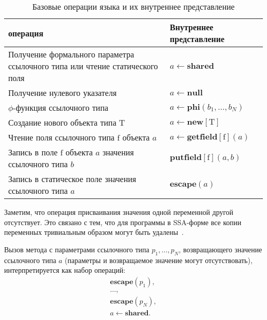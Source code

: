 \documentclass[14pt,titlepage,draft]{extarticle}
\newcommand{\java}{\eng{Java}\xspace}
\let\mathphi\phi
\renewcommand{\phi}{\ensuremath{\mathphi}}
\newcommand{\type}[1]{\mathrm{#1}}
\newcommand{\field}[1]{\mathrm{#1}}
\newcommand{\op}[1]{\mathbf{#1}}
\begin{document}
    \begin{table}[htb]
      \centering

      \begin{tabular}{|p{}|p{}|}\hline
        \textbf{\java операция} &
          \textbf{Внутреннее представление}\\ \hline

        Получение формального параметра ссылочного типа или
        чтение статического поля
        & $a \gets \op{shared}$
        \\ \hline

        Получение нулевого указателя
        & $a \gets \op{null}$
        \\ \hline

        \phi-функция ссылочного типа
        & $a \gets \op{phi}(b_1, \ldots, b_N)$
        \\ \hline

        Создание нового объекта типа $\type{T}$
        & $a \gets \op{new}[\type{T}]$
        \\ \hline

        Чтение поля ссылочного типа $\field{f}$ объекта $a$
        & $a \gets \op{getfield}[\field{f}](a)$
        \\ \hline

        Запись в поле $\field{f}$ объекта $a$ значения ссылочного типа $b$
        & $\op{putfield}[\field{f}](a, b)$
        \\ \hline

        Запись в статическое поле значения ссылочного типа $a$
        & $\op{escape}(a)$
        \\ \hline

      \end{tabular}
      \caption{Базовые операции языка \java и их внутреннее представление}
      \label{tabular:basic_operations}
    \end{table}

    Заметим, что операция присваивания значения одной переменной другой
    отсутствует.
    Это связано с тем, что для программы в SSA-форме все копии переменных
    тривиальным образом могут быть удалены~\cite{ssa}.

    Вызов метода с параметрами ссылочного типа $p_1, \ldots, p_N$, возвращающего
    значение ссылочного типа $a$ (параметры и возвращаемое значение могут
    отсутствовать), интерпретируется как набор операций:
    \begin{gather*}
      \op{escape}(p_1), \\
      \ldots, \\
      \op{escape}(p_N), \\
      a \gets \op{shared}.
    \end{gather*}
\end{document}
